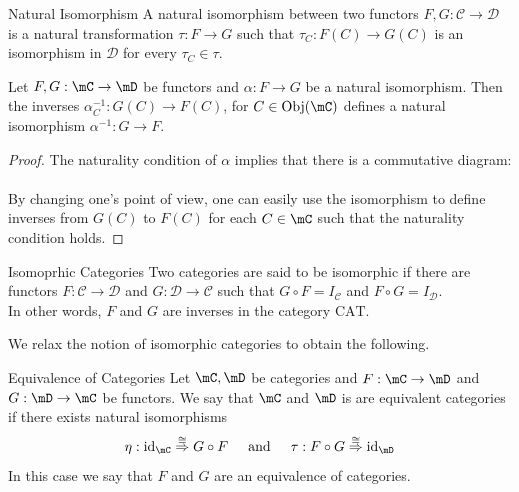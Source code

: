 \documentclass[a4paper]{article}
\begin{document}
\begin{defn}{Natural Isomorphism}{} A natural isomorphism between two functors $F,G:\mathcal{C}\to\mathcal{D}$ is a natural transformation $\tau:F\to G$ such that $\tau_C:F(C)\to G(C)$ is an isomorphism in $\mathcal{D}$ for every $\tau_C\in\tau$. 
\end{defn}

\begin{lmm}{}{} Let $F,G:\mC\to\mD$ be functors and $\alpha:F\to G$ be a natural isomorphism. Then the inverses $\alpha^{-1}_C:G(C)\to F(C)$, for $C\in\text{Obj}(\mC)$ defines a natural isomorphism $\alpha^{-1}:G\to F$. 
\begin{proof}
The naturality condition of $\alpha$ implies that there is a commutative diagram: \\
\\
By changing one's point of view, one can easily use the isomorphism to define inverses from $G(C)$ to $F(C)$ for each $C\in\mC$ such that the naturality condition holds. 
\end{proof}
\end{lmm}

\begin{defn}{Isomoprhic Categories}{} Two categories are said to be isomorphic if there are functors $F:\mathcal{C}\to\mathcal{D}$ and $G:\mathcal{D}\to\mathcal{C}$ such that $G\circ F=I_\mathcal{C}$ and $F\circ G=I_\mathcal{D}$. \\
In other words, $F$ and $G$ are inverses in the category $\text{CAT}$. 
\end{defn}

We relax the notion of isomorphic categories to obtain the following. 

\begin{defn}{Equivalence of Categories}{} Let $\mC,\mD$ be categories and $F:\mC\to\mD$ and $G:\mD\to\mC$ be functors. We say that $\mC$ and $\mD$ is are equivalent categories if there exists natural isomorphisms $$
\eta:\text{id}_\mC\overset{\cong}{\Rightarrow}G\circ F\;\;\;\;\text{ and }\;\;\;\;
\tau:F\circ G\overset{\cong}{\Rightarrow}\text{id}_\mD$$
In this case we say that $F$ and $G$ are an equivalence of categories. 
\end{defn}
\end{document}
